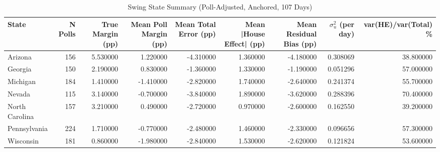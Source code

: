 \begin{table}
\caption{Swing State Summary (Poll-Adjusted, Anchored, 107 Days)}
\label{tab:swing_states_summary}
\begin{tabular}{lrrrrrrrr}
\toprule
State & N Polls & True Margin (pp) & Mean Poll Margin (pp) & Mean Total Error (pp) & Mean |House Effect| (pp) & Mean Residual Bias (pp) & $\sigma^2_u$ (per day) & var(HE)/var(Total) \% \\
\midrule
Arizona & 156 & 5.530000 & 1.220000 & -4.310000 & 1.360000 & -4.180000 & 0.308069 & 38.800000 \\
Georgia & 150 & 2.190000 & 0.830000 & -1.360000 & 1.330000 & -1.190000 & 0.051296 & 57.000000 \\
Michigan & 184 & 1.410000 & -1.410000 & -2.820000 & 1.740000 & -2.640000 & 0.241374 & 55.700000 \\
Nevada & 115 & 3.140000 & -0.700000 & -3.840000 & 1.890000 & -3.620000 & 0.288396 & 70.400000 \\
North Carolina & 157 & 3.210000 & 0.490000 & -2.720000 & 0.970000 & -2.600000 & 0.162550 & 39.200000 \\
Pennsylvania & 224 & 1.710000 & -0.770000 & -2.480000 & 1.460000 & -2.330000 & 0.096656 & 57.300000 \\
Wisconsin & 181 & 0.860000 & -1.980000 & -2.840000 & 1.530000 & -2.620000 & 0.121824 & 53.600000 \\
\bottomrule
\end{tabular}
\end{table}
